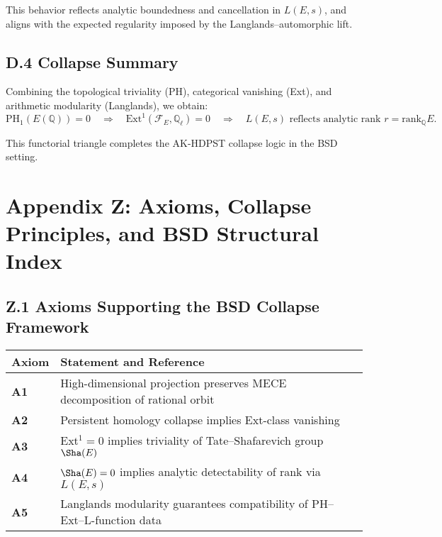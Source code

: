 This behavior reflects analytic boundedness and cancellation in \( L(E, s) \), and aligns with the expected regularity imposed by the Langlands–automorphic lift.

\subsection*{D.4 Collapse Summary}

Combining the topological triviality (PH), categorical vanishing (Ext), and arithmetic modularity (Langlands), we obtain:
\[
\mathrm{PH}_1(E(\mathbb{Q})) = 0
\quad \Rightarrow \quad
\mathrm{Ext}^1(\mathcal{F}_E, \mathbb{Q}_\ell) = 0
\quad \Rightarrow \quad
L(E,s) \text{ reflects analytic rank } r = \mathrm{rank}_\mathbb{Q}E.
\]

This functorial triangle completes the AK-HDPST collapse logic in the BSD setting.

\section*{Appendix Z: Axioms, Collapse Principles, and BSD Structural Index}

\subsection*{Z.1 Axioms Supporting the BSD Collapse Framework}

\begin{tabular}{ll}
\textbf{Axiom} & \textbf{Statement and Reference} \\
\hline
\textbf{A1} & High-dimensional projection preserves MECE decomposition of rational orbit \quad [Appendix C] \\
\textbf{A2} & Persistent homology collapse implies Ext-class vanishing \quad [Appendix B, G] \\
\textbf{A3} & Ext$^1 = 0$ implies triviality of Tate--Shafarevich group \( \Sha(E) \) \quad [Appendix A] \\
\textbf{A4} & \( \Sha(E) = 0 \) implies analytic detectability of rank via \( L(E,s) \)  \\
\textbf{A5} & Langlands modularity guarantees compatibility of PH–Ext–L-function data \quad [Appendix D] \\
\end{tabular}

\medskip

